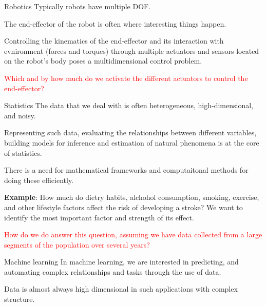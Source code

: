 \documentclass[aspectratio=169]{beamer}
\begin{document}
\begin{frame}{Robotics}
  Typically robots have multiple DOF.
  \vspace{0.2cm}
  
  The end-effector of the robot is often where interesting things happen. 
  \vspace{0.2cm}
  
  Controlling the kinematics of the end-effector and its interaction with evnironment (forces and torques) through multiple actuators and sensors located on the robot's body poses a multidimensional control problem.
  \vspace{0.2cm}

  \textcolor{red}{Which and by how much do we activate the different actuators to control the end-effector?}
\end{frame}


\begin{frame}{Statistics}
  The data that we deal with is often heterogeneous, high-dimensional, and noisy.
  \vspace{0.2cm}
  
  Representing such data, evaluating the relationships between different variables, building models for inference and estimation of natural phenomena is at the core of statistics. 
  \vspace{0.2cm}
  
  There is a need for mathematical frameworks and computaitonal methods for doing these efficiently.
  \vspace{0.2cm}
  
  \textbf{Example}: How much do dietry habits, alchohol consumption, smoking, exercise, and other lifestyle factors affect the risk of developing a stroke? We want to identify the most important factor and strength of its effect.

  \textcolor{red}{How do we do answer this question, assuming we have data collected from a large segments of the population over several years?}
\end{frame}


\begin{frame}{Machine learning}
  In machine learning, we are interested in predicting, and automating complex relationships and tasks through the use of data.
  \vspace{0.2cm}
  
  Data is almost always high dimensional in such applications with complex structure.
  \vspace{0.2cm}
  
\end{frame}
\end{document}
